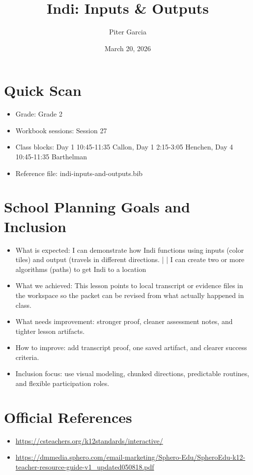 \documentclass[11pt]{article}
\title{Indi: Inputs & Outputs}
\author{Piter Garcia}
\date{March 20, 2026}
\begin{document}
    \maketitle
    \section*{Quick Scan}
    \begin{itemize}[leftmargin=*]
    \item Grade: Grade 2
    \item Workbook sessions: Session 27
    \item Class blocks: Day 1 10:45-11:35 Callon, Day 1 2:15-3:05 Henchen, Day 4 10:45-11:35 Barthelman
    \item Reference file: indi-inputs-and-outputs.bib
    \end{itemize}
    \section*{School Planning Goals and Inclusion}
    \begin{itemize}[leftmargin=*]
    \item What is expected: I can demonstrate how Indi functions using inputs (color tiles) and output (travels in different directions. | | I can create two or more algorithms (paths) to get Indi to a location
    \item What we achieved: This lesson points to local transcript or evidence files in the workspace so the packet can be revised from what actually happened in class.
    \item What needs improvement: stronger proof, cleaner assessment notes, and tighter lesson artifacts.
    \item How to improve: add transcript proof, one saved artifact, and clearer success criteria.
    \item Inclusion focus: use visual modeling, chunked directions, predictable routines, and flexible participation roles.
    \end{itemize}
    \section*{Official References}
    \begin{itemize}[leftmargin=*]
    \item \url{https://csteachers.org/k12standards/interactive/}
\item \url{https://dmmedia.sphero.com/email-marketing/Sphero-Edu/SpheroEdu-k12-teacher-resource-guide-v1_updated050818.pdf}

    \end{itemize}
    
\end{document}
